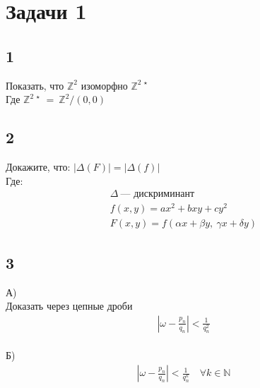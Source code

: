 \newpage
\section{Задачи 1}
	\subsection{1}
	Показать, что $\mathbb{Z}^2$ изоморфно $\mathbb{Z}^{2 \: \star}$\\
	Где $\mathbb{Z}^{2 \: \star} \ = \ \mathbb{Z}^2 / (0, 0)$
	
	\subsection{2}
	Докажите, что: $|\Delta(F)| = |\Delta(f)|$\\
	Где:
	\begin{gather*}
	\Delta \: \text{--- дискриминант}\\
	f(x,y) = ax^2 + bxy + cy^2\\
	F(x,y) = f(\alpha x + \beta y,\: \gamma x + \delta y)
	\end{gather*}
	
	\subsection{3}
	А)\\
	Доказать через цепные дроби
	\begin{gather*}
	|\omega - \frac{p_n}{q_n} | < \frac{1}{q^2_n}
	\end{gather*}
	\\
	Б)\\
	\begin{gather*}
	|\omega - \frac{p_n}{q_n} | < \frac{1}{q^k_n} \quad \forall k \in \mathbb{N} 
	\end{gather*}